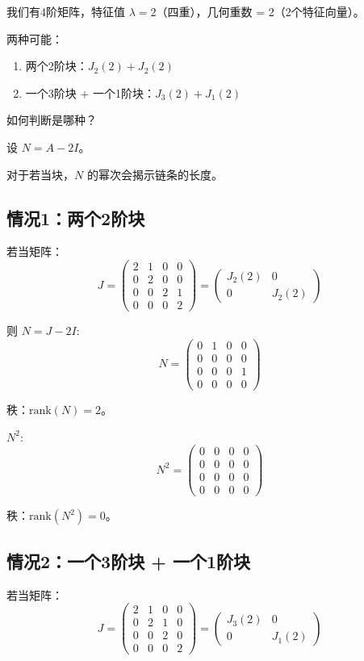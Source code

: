 \documentclass[12pt,a4paper]{article}
\begin{document}
我们有4阶矩阵，特征值 $\lambda = 2$（四重），几何重数 = 2（2个特征向量）。

两种可能：
\begin{enumerate}
    \item 两个2阶块：$J_2(2) + J_2(2)$
    \item 一个3阶块 + 一个1阶块：$J_3(2) + J_1(2)$
\end{enumerate}

如何判断是哪种？

设 $N = A - 2I$。

对于若当块，$N$ 的幂次会揭示链条的长度。

\subsection{情况1：两个2阶块}

若当矩阵：
\[
J = \begin{pmatrix}
2 & 1 & 0 & 0 \\
0 & 2 & 0 & 0 \\
0 & 0 & 2 & 1 \\
0 & 0 & 0 & 2
\end{pmatrix}
= \begin{pmatrix} J_2(2) & 0 \\ 0 & J_2(2) \end{pmatrix}
\]

则 $N = J - 2I$:
\[
N = \begin{pmatrix}
0 & 1 & 0 & 0 \\
0 & 0 & 0 & 0 \\
0 & 0 & 0 & 1 \\
0 & 0 & 0 & 0
\end{pmatrix}
\]

秩：$\text{rank}(N) = 2$。

$N^2$:
\[
N^2 = \begin{pmatrix}
0 & 0 & 0 & 0 \\
0 & 0 & 0 & 0 \\
0 & 0 & 0 & 0 \\
0 & 0 & 0 & 0
\end{pmatrix}
\]

秩：$\text{rank}(N^2) = 0$。

\subsection{情况2：一个3阶块 + 一个1阶块}

若当矩阵：
\[
J = \begin{pmatrix}
2 & 1 & 0 & 0 \\
0 & 2 & 1 & 0 \\
0 & 0 & 2 & 0 \\
0 & 0 & 0 & 2
\end{pmatrix}
= \begin{pmatrix} J_3(2) & 0 \\ 0 & J_1(2) \end{pmatrix}
\]
\end{document}

